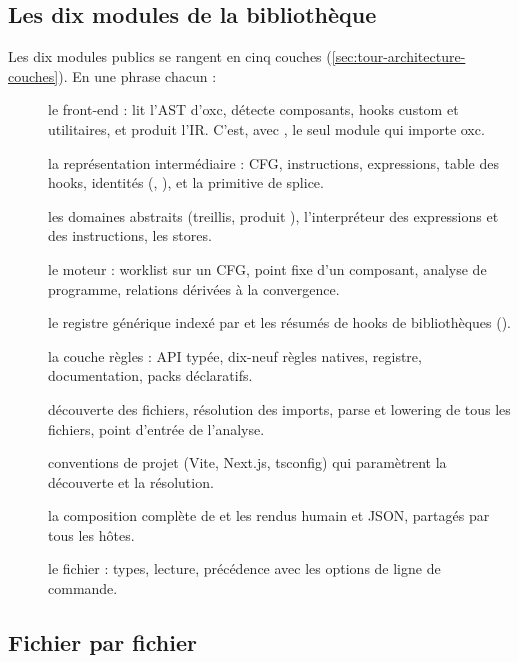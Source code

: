 \subsection{Les dix modules de la bibliothèque}

Les dix modules publics se rangent en cinq couches (\cref{sec:tour-architecture-couches}). En une phrase chacun :

\begin{description}
  \item[] le front-end : lit l'AST d'oxc, détecte composants, hooks custom et utilitaires, et produit l'IR. C'est, avec , le seul module qui importe oxc.
  \item[] la représentation intermédiaire : CFG, instructions, expressions, table des hooks, identités (, ), et la primitive de splice.
  \item[] les domaines abstraits (treillis, produit ), l'interpréteur des expressions et des instructions, les stores.
  \item[] le moteur : worklist sur un CFG, point fixe d'un composant, analyse de programme, relations dérivées à la convergence.
  \item[] le registre générique indexé par  et les résumés de hooks de bibliothèques ().
  \item[] la couche règles : API typée, dix-neuf règles natives, registre, documentation, packs déclaratifs.
  \item[] découverte des fichiers, résolution des imports, parse et lowering de tous les fichiers, point d'entrée de l'analyse.
  \item[] conventions de projet (Vite, Next.js, tsconfig) qui paramètrent la découverte et la résolution.
  \item[] la composition complète de  et les rendus humain et JSON, partagés par tous les hôtes.
  \item[] le fichier  : types, lecture, précédence avec les options de ligne de commande.
\end{description}

\subsection{Fichier par fichier}

